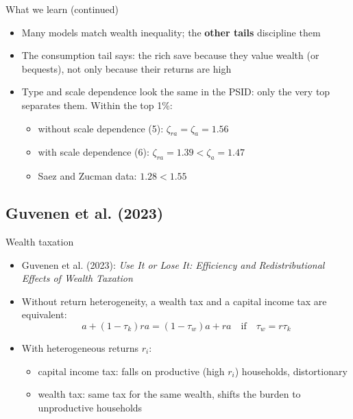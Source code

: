 \documentclass[10pt,english,10pt]{beamer}
\begin{document}
\begin{frame}{What we learn (continued)}
\begin{itemize}
\item Many models match wealth inequality; the \textbf{other tails} discipline them
\item The consumption tail says: the rich save because they value wealth (or bequests), not only because their returns are high
\item Type and scale dependence look the same in the PSID: only the very top separates them. Within the top 1\%:
\begin{itemize}
\item without scale dependence (5): $\zeta_{ra}=\zeta_{a}=1.56$
\item with scale dependence (6): $\zeta_{ra}=1.39<\zeta_{a}=1.47$
\item Saez and Zucman data: $1.28<1.55$
\end{itemize}
\end{itemize}
\end{frame}

\subsection{Guvenen et al. (2023)}

\begin{frame}{Wealth taxation}
\begin{itemize}
\item Guvenen et al. (2023): \emph{Use It or Lose It: Efficiency and Redistributional Effects of Wealth Taxation}
\item Without return heterogeneity, a wealth tax and a capital income tax are equivalent:
\[
a+(1-\tau_{k})ra=(1-\tau_{w})a+ra\quad\text{if}\quad\tau_{w}=r\tau_{k}
\]
\item With heterogeneous returns $r_{i}$:
\begin{itemize}
\item capital income tax: falls on productive (high $r_{i}$) households, distortionary
\item wealth tax: same tax for the same wealth, shifts the burden to unproductive households
\end{itemize}
\end{itemize}
\end{frame}
\end{document}
